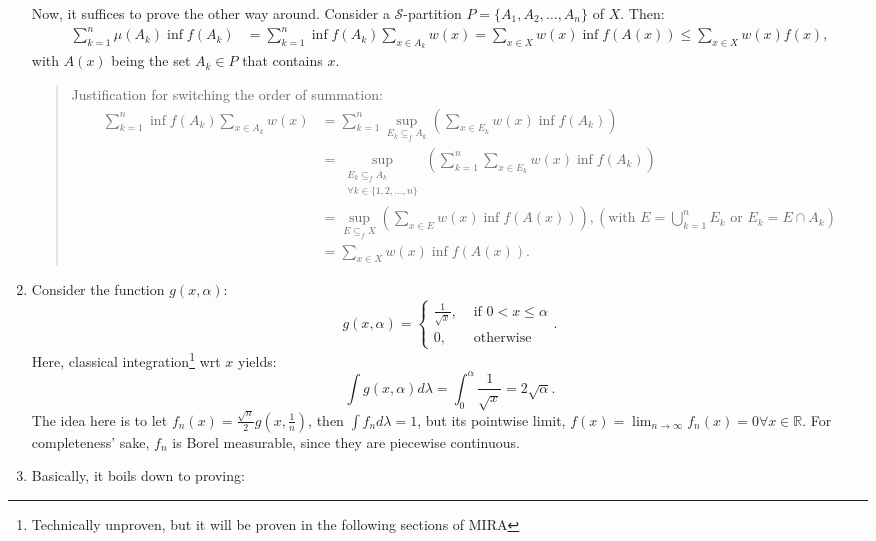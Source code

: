 \begin{enumerate}[label=\textbf{3A.\arabic*}]
    Now, it suffices to prove the other way around. Consider a \( \mathcal{S}
    \)-partition \( P = \{A_{1}, A_{2}, \ldots , A_{n}\}   \) of \( X \). Then:
    \begin{align*}
      \sum_{k = 1}^{n} \mu (A_{k}) \inf f(A_{k}) &= \sum_{k = 1}^{n} \inf
      f(A_{k})\sum_{x \in A_{k}} w(x) = \sum_{x \in X} w(x) \inf f(A(x))
      \le \sum_{x \in X} w(x) f(x)
    ,\end{align*} with \( A(x) \) being the set \( A_{k} \in P \) that contains \( x
    \).
    \begin{quote}
      Justification for switching the order of summation:
      \begin{align*}
        \sum_{k = 1}^{n} \inf f(A_{k}) \sum_{x \in A_{k}} w(x) &= \sum_{k =
        1}^{n} \sup _{E_{k} \subseteq_{f} A_{k}}
        \left( \sum_{x \in E_{k}} w(x) \inf f(A_{k}) \right) \\
        &= \sup _{\substack{E_{k} \subseteq_{f} A_{k}\\\forall k \in \{1, 2,
        \ldots , n\}  }} 
        \left( \sum_{k = 1}^{n} \sum_{x \in E_{k}} w(x) \inf f(A_{k}) \right) \\
        &= \sup _{E \subseteq_{f} X} \left( \sum_{x \in E} w(x) \inf f(A(x))
        \right), \left(\text{with }E = \bigcup_{k = 1}^{n} E_{k} \text{ or
          } E_{k} = E \cap A_{k}\right) \\
        &= \sum_{x \in X} w(x) \inf f(A(x))
      .\end{align*}
    \end{quote}
  \item Consider the function \( g(x, \alpha) \):
    \[
      g(x, \alpha) = \begin{cases}
        \frac{1}{\sqrt{x} }, &\text{ if } 0 < x \le \alpha\\
        0, &\text{ otherwise}
      \end{cases}
    .\] 
    Here, classical integration\footnote{Technically unproven, but it will be
    proven in the following sections of MIRA} wrt \( x \) yields:
    \[
      \int g(x, \alpha) d\lambda = \int _{0}^{\alpha} \frac{1}{\sqrt{x} } =
      2\sqrt{\alpha} 
    .\] 
    The idea here is to let \( f_{n}(x) = \frac{\sqrt{n} }{2}g \left( x,
    \frac{1}{n} \right)  \), then \( \int f_{n}d\lambda = 1 \), but its
    pointwise limit, \( f(x) = \lim_{n \to \infty} f_{n}(x) = 0 \forall  x \in
    \mathbb{R} \). For completeness' sake, \( f_{n} \) is Borel measurable,
    since they are piecewise continuous.
  \item Basically, it boils down to proving:

\end{enumerate}
